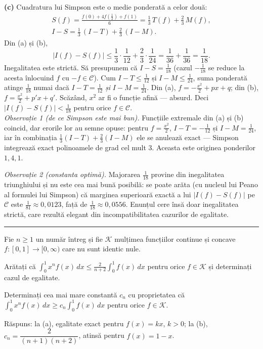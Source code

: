\noindent\textbf{(c)} Cuadratura lui Simpson este o medie ponderată a celor două:
\[ \begin{gathered} S(f)=\frac{f(0)+4f\left(\frac12\right)+f(1)}{6}=\frac13\,T(f)+\frac23\,M(f),\\ I-S=\frac13\,(I-T)+\frac23\,(I-M) . \end{gathered} \]
Din (a) și (b),
\[ |I(f)-S(f)|\le\frac13\cdot\frac1{12}+\frac23\cdot\frac1{24}=\frac1{36}+\frac1{36}=\frac1{18} . \]
Inegalitatea este strictă. Să presupunem că $I-S=\frac1{18}$ (cazul $-\frac1{18}$ se reduce la acesta înlocuind $f$ cu $-f\in\mathcal{C}$). Cum $I-T\le\frac1{12}$ și $I-M\le\frac1{24}$, suma ponderată atinge $\frac1{18}$ numai dacă $I-T=\frac1{12}$ \emph{și} $I-M=\frac1{24}$. Din (a), $f=-\frac{x^{2}}{2}+px+q$; din (b), $f=\frac{x^{2}}{2}+p'x+q'$. Scăzând, $x^{2}$ ar fi o funcție afină --- absurd. Deci $|I(f)-S(f)|<\frac1{18}$ pentru orice $f\in\mathcal{C}$.\\[2pt]
\emph{Observație 1 (de ce Simpson este mai bun).} Funcțiile extremale din (a) și (b) coincid, dar erorile lor au semne opuse: pentru $f=\frac{x^{2}}{2}$, $I-T=-\frac1{12}$ și $I-M=\frac1{24}$, iar în combinația $\frac13(I-T)+\frac23(I-M)$ ele se anulează exact --- Simpson integrează exact polinoamele de grad cel mult $3$. Aceasta este originea ponderilor $1,4,1$.

\emph{Observație 2 (constanta optimă).} Majorarea $\frac1{18}$ provine din inegalitatea triunghiului și nu este cea mai bună posibilă: se poate arăta (cu nucleul lui Peano al formulei lui Simpson) că marginea superioară exactă a lui $|I(f)-S(f)|$ pe $\mathcal{C}$ este $\frac1{81}\approx0{,}0123$, față de $\frac1{18}\approx0{,}0556$. Enunțul cere însă doar inegalitatea strictă, care rezultă elegant din incompatibilitatea cazurilor de egalitate.
\vspace{1mm}\hrule

Fie $n\ge1$ un număr întreg și fie $\mathcal{K}$ mulțimea funcțiilor continue și concave
$f:[0,1]\to[0,\infty)$ care nu sunt identic nule.
\begin{parti}
  \item Arătați că
        $\displaystyle\int_0^1 x^{n}f(x)\,dx\le\frac{2}{n+2}\int_0^1 f(x)\,dx$
        pentru orice $f\in\mathcal{K}$ și determinați cazul de egalitate.
  \item Determinați cea mai mare constantă $c_n$ cu proprietatea că
        $\displaystyle\int_0^1 x^{n}f(x)\,dx\ge c_n\int_0^1 f(x)\,dx$ pentru orice
        $f\in\mathcal{K}$.
\end{parti}
\sol Răspuns: la (a), egalitate exact pentru $f(x)=kx$, $k>0$; la (b), $c_{n}=\dfrac{2}{(n+1)(n+2)}$, atinsă pentru $f(x)=1-x$.

